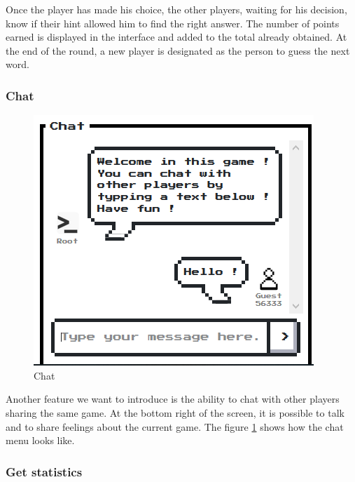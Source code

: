 \documentclass{tnreport}
\begin{document}
Once the player has made his choice, the other players, waiting for his decision, know if their hint allowed him to find the right answer. The number of points earned is displayed in the interface and added to the total already obtained. At the end of the round, a new player is designated as the person to guess the next word.

\bigskip

\subsubsection{Chat}

\begin{figure}
	\centering
	\vspace*{-2cm}
	\includegraphics[scale=0.58]{figures/chat}
	\caption{Chat}
	\label{fig:chat}
	\vspace*{-2cm}
\end{figure}

Another feature we want to introduce is the ability to chat with other players sharing the same game. At the bottom right of the screen, it is possible to talk and to share feelings about the current game. The figure \ref{fig:chat} shows how the chat menu looks like.

\clearpage

\subsubsection{Get statistics}
\end{document}

